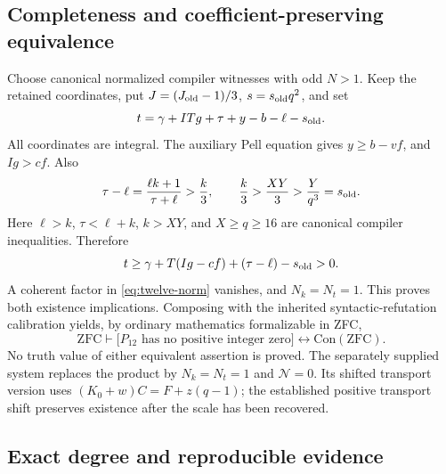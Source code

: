 \subsection{Completeness and coefficient-preserving equivalence}

Choose canonical normalized compiler witnesses with odd $N>1$. Keep the
retained coordinates, put $J=(J_{\rm old}-1)/3$, $s=s_{\rm old}q^2$, and set
\[
 t=\gamma+ITg+\tau+y-b-\ell-s_{\rm old}.
\]
All coordinates are integral. The auxiliary Pell equation gives
$y\ge b-vf$, and $Ig>cf$. Also
\[
 \tau-\ell=\frac{\ell k+1}{\tau+\ell}>\frac{k}{3},
 \qquad
 \frac{k}{3}>\frac{XY}{3}>\frac{Y}{q^3}=s_{\rm old}.
\]
Here $\ell>k$, $\tau<\ell+k$, $k>XY$, and $X\ge q\ge16$ are canonical
compiler inequalities. Therefore
\[
 t\ge\gamma+T(Ig-cf)+(\tau-\ell)-s_{\rm old}>0.
\]
A coherent factor in \eqref{eq:twelve-norm} vanishes, and $N_k=N_t=1$.
This proves both existence implications. Composing with the inherited
syntactic-refutation calibration yields, by ordinary mathematics formalizable
in ZFC,
\[
 \mathrm{ZFC}\vdash
 \bigl[\text{$P_{12}$ has no positive integer zero}\bigr]
 \longleftrightarrow\mathrm{Con}(\mathrm{ZFC}).
\]
No truth value of either equivalent assertion is proved. The separately
supplied system replaces the product by $N_k=N_t=1$ and $\mathcal N=0$.
Its shifted transport version uses $(K_0+w)C=F+z(q-1)$; the established
positive transport shift preserves existence after the scale has been
recovered.

\subsection{Exact degree and reproducible evidence}

